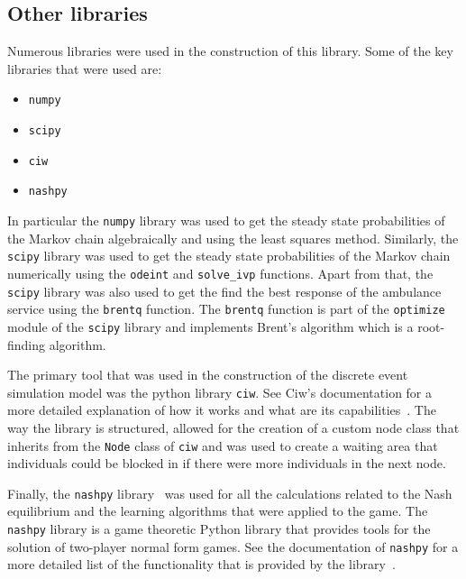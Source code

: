\subsection{Other libraries}

Numerous libraries were used in the construction of this library.
Some of the key libraries that were used are:

\begin{itemize}
    \item \texttt{numpy}~\cite{2020NumPy-Array}
    \item \texttt{scipy}~\cite{2020SciPy-NMeth}
    \item \texttt{ciw}~\cite{ciwpython}
    \item \texttt{nashpy}~\cite{thenashpyproject}
\end{itemize}

In particular the \texttt{numpy} library was used to get the steady state
probabilities of the Markov chain algebraically and using the least squares
method.
Similarly, the \texttt{scipy} library was used to get the steady state
probabilities of the Markov chain numerically using the \texttt{odeint} and
\texttt{solve\_ivp} functions.
Apart from that, the \texttt{scipy} library was also used to get the find
the best response of the ambulance service using the \texttt{brentq} function.
The \texttt{brentq} function is part of the \texttt{optimize} module of the
\texttt{scipy} library and implements Brent's algorithm which is a
root-finding algorithm.

The primary tool that was used in the construction of the discrete event
simulation model was the python library \texttt{ciw}.
See Ciw's documentation for a more detailed explanation of how it works and
what are its capabilities~\cite{ciwpython}.
The way the library is structured, allowed for the creation of a custom
node class that inherits from the \texttt{Node} class of \texttt{ciw} and
was used to create a waiting area that individuals could be blocked in if
there were more individuals in the next node.

Finally, the \texttt{nashpy} library~\cite{thenashpyproject} was used for all
the calculations related to the Nash equilibrium and the learning algorithms
that were applied to the game.
The \texttt{nashpy} library is a game theoretic Python library that provides
tools for the solution of two-player normal form games.
See the documentation of \texttt{nashpy} for a more detailed list of the
functionality that is provided by the library~\cite{thenashpyproject}.
